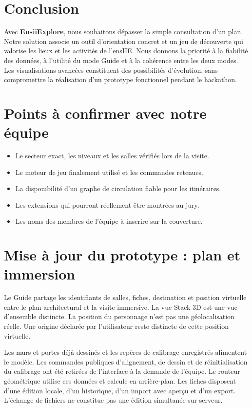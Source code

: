 \documentclass[11pt,a4paper]{article}
\begin{document}
\section{Conclusion}
Avec \textbf{EnsiiExplore}, nous souhaitons dépasser la simple consultation d'un plan. Notre solution associe un outil d'orientation concret et un jeu de découverte qui valorise les lieux et les activités de l'ensIIE. Nous donnons la priorité à la fiabilité des données, à l'utilité du mode Guide et à la cohérence entre les deux modes. Les visualisations avancées constituent des possibilités d'évolution, sans compromettre la réalisation d'un prototype fonctionnel pendant le hackathon.

\section*{Points à confirmer avec notre équipe}
\begin{itemize}
\item Le secteur exact, les niveaux et les salles vérifiés lors de la visite.
\item Le moteur de jeu finalement utilisé et les commandes retenues.
\item La disponibilité d'un graphe de circulation fiable pour les itinéraires.
\item Les extensions qui pourront réellement être montrées au jury.
\item Les noms des membres de l'équipe à inscrire sur la couverture.
\end{itemize}

\section{Mise à jour du prototype : plan et immersion}
Le Guide partage les identifiants de salles, fiches, destination et position virtuelle entre le plan architectural et la visite immersive. La vue Stack 3D est une vue d'ensemble distincte. La position du personnage n'est pas une géolocalisation réelle. Une origine déclarée par l'utilisateur reste distincte de cette position virtuelle.

Les murs et portes déjà dessinés et les repères de calibrage enregistrés alimentent le modèle. Les commandes publiques d'alignement, de dessin et de réinitialisation du calibrage ont été retirées de l'interface à la demande de l'équipe. Le routeur géométrique utilise ces données et calcule en arrière-plan. Les fiches disposent d'une édition locale, d'un historique, d'un import avec aperçu et d'un export. L'échange de fichiers ne constitue pas une édition simultanée sur serveur.
\end{document}
